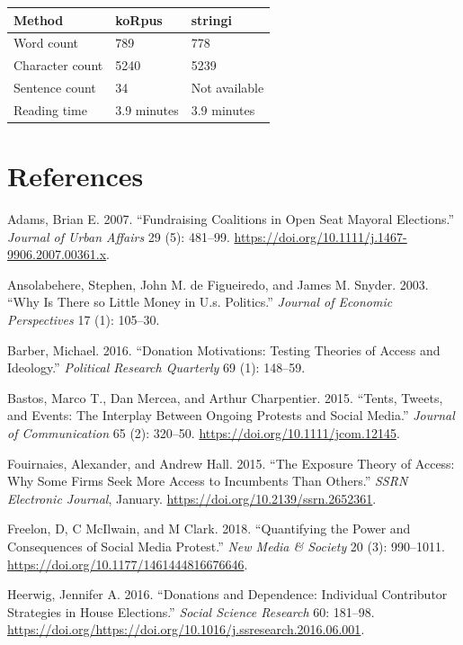 \documentclass[12pt,]{article}
\begin{document}
\begin{longtable}[]{@{}lll@{}}
\toprule
Method & koRpus & stringi\tabularnewline
\midrule
\endhead
Word count & 789 & 778\tabularnewline
Character count & 5240 & 5239\tabularnewline
Sentence count & 34 & Not available\tabularnewline
Reading time & 3.9 minutes & 3.9 minutes\tabularnewline
\bottomrule
\end{longtable}

\hypertarget{references}{%
\section*{References}\label{references}}

\hypertarget{refs}{}
\leavevmode\hypertarget{ref-adams2016}{}%
Adams, Brian E. 2007. ``Fundraising Coalitions in Open Seat Mayoral
Elections.'' \emph{Journal of Urban Affairs} 29 (5): 481--99.
\url{https://doi.org/10.1111/j.1467-9906.2007.00361.x}.

\leavevmode\hypertarget{ref-ansolabehere2003}{}%
Ansolabehere, Stephen, John M. de Figueiredo, and James M. Snyder. 2003.
``Why Is There so Little Money in U.s. Politics.'' \emph{Journal of
Economic Perspectives} 17 (1): 105--30.

\leavevmode\hypertarget{ref-barber2016}{}%
Barber, Michael. 2016. ``Donation Motivations: Testing Theories of
Access and Ideology.'' \emph{Political Research Quarterly} 69 (1):
148--59.

\leavevmode\hypertarget{ref-bastos2015}{}%
Bastos, Marco T., Dan Mercea, and Arthur Charpentier. 2015. ``Tents,
Tweets, and Events: The Interplay Between Ongoing Protests and Social
Media.'' \emph{Journal of Communication} 65 (2): 320--50.
\url{https://doi.org/10.1111/jcom.12145}.

\leavevmode\hypertarget{ref-fouirnaies2015}{}%
Fouirnaies, Alexander, and Andrew Hall. 2015. ``The Exposure Theory of
Access: Why Some Firms Seek More Access to Incumbents Than Others.''
\emph{SSRN Electronic Journal}, January.
\url{https://doi.org/10.2139/ssrn.2652361}.

\leavevmode\hypertarget{ref-freelon2018}{}%
Freelon, D, C McIlwain, and M Clark. 2018. ``Quantifying the Power and
Consequences of Social Media Protest.'' \emph{New Media \& Society} 20
(3): 990--1011. \url{https://doi.org/10.1177/1461444816676646}.

\leavevmode\hypertarget{ref-heerwig2016}{}%
Heerwig, Jennifer A. 2016. ``Donations and Dependence: Individual
Contributor Strategies in House Elections.'' \emph{Social Science
Research} 60: 181--98.
\url{https://doi.org/https://doi.org/10.1016/j.ssresearch.2016.06.001}.
\end{document}
